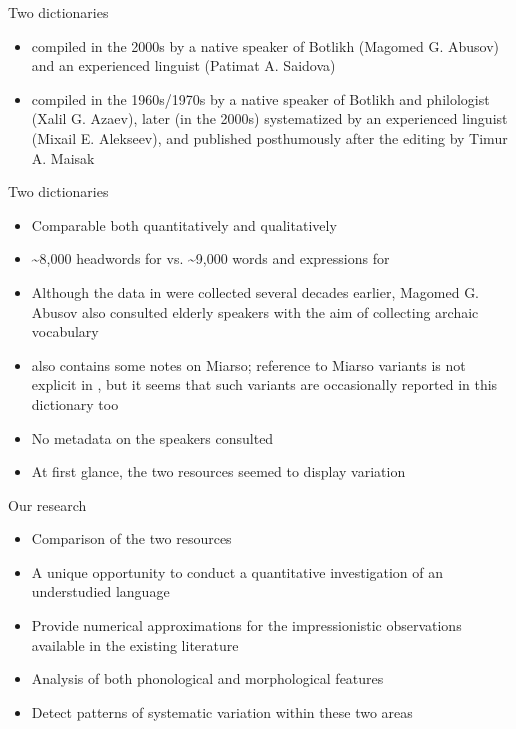 \begin{frame}{Two dictionaries}
\begin{itemize}
    \item \citet{saidovaabusov2012} compiled in the 2000s by a native speaker of Botlikh (Magomed G. Abusov) and an experienced linguist (Patimat A. Saidova)
    \item \citet{alekseev2019} compiled in the 1960s/1970s by a native speaker of Botlikh and philologist (Xalil G. Azaev), later (in the 2000s) systematized by an experienced linguist (Mixail E. Alekseev), and published posthumously after the editing by Timur A. Maisak
\end{itemize}
\end{frame}

\begin{frame}{Two dictionaries}
\begin{itemize}
    \item Comparable both quantitatively and qualitatively
    \item \textasciitilde{}8,000 headwords for \citet{saidovaabusov2012} vs. \textasciitilde{}9,000 words and expressions for \citet{alekseev2019}
    \item Although the data in \citet{alekseev2019} were collected several decades earlier, Magomed G. Abusov also consulted elderly speakers with the aim of collecting archaic vocabulary 
    \item \citet{saidovaabusov2012} also contains some notes on Miarso; reference to Miarso variants is not explicit in \citet{alekseev2019}, but it seems that such variants are occasionally reported in this dictionary too
    \item No metadata on the speakers consulted
    \item At first glance, the two resources seemed to display variation
\end{itemize}
\end{frame}

\begin{frame}{Our research}
\begin{itemize}
    \item Comparison of the two resources
    \item A unique opportunity to conduct a quantitative investigation of an understudied language
    \item Provide numerical approximations for the impressionistic observations available in the existing literature
    \item Analysis of both phonological and morphological features 
    \item Detect patterns of systematic variation within these two areas
\end{itemize}
\end{frame}

